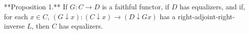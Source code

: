 **Proposition 1.** If $G: C \to D$ is a faithful functor, if $D$ has equalizers, and if, for each $x \in C$, $(G \downarrow x): (C \downarrow x) \to (D \downarrow Gx)$ has a right-adjoint-right-inverse $L$, then $C$ has equalizers.
